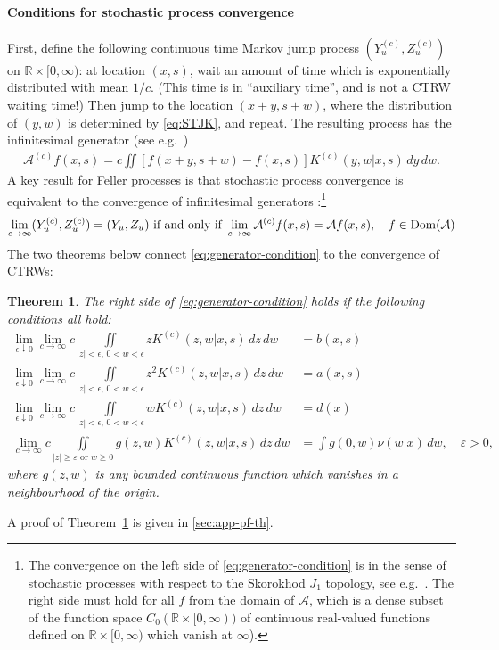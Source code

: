 \documentclass[a4paper,12pt]{elsarticle}
\numberwithin{equation}{section}
\theoremstyle{plain}
\newtheorem{theorem}{Theorem}[section]
\theoremstyle{definition}
\theoremstyle{remark}
\numberwithin{equation}{section}
\newcommand{\spc}{\mathbb R}
\newcommand{\spctim}{\spc \times [0,\infty)}
\newcommand{\1}{\mathbf 1}
\begin{document}
\paragraph{Conditions for stochastic process convergence}
First, define the following continuous time Markov jump process $(Y^{(c)}_u, Z^{(c)}_u)$ on 
$\spctim$: at location $(x,s)$, wait an amount of time which is exponentially distributed with mean $1/c$. (This time is in ``auxiliary time'', and is not a CTRW waiting time!) Then jump to the location $(x+y, s+w)$, where the distribution of $(y,w)$ is determined by \eqref{eq:STJK}, and repeat. The resulting process has the infinitesimal generator
(see e.g.\ \cite[Proposition 17.2]{Kallenberg}) 
\begin{align} \label{eq:jump-process-generator}
\mathcal A^{(c)} f(x,s) = c \iint [f(x+y, s+w) - f(x,s)] K^{(c)}(y,w | x,s)\,dy\,dw.
\end{align}
A key result for Feller processes is that stochastic process convergence is equivalent to the convergence of infinitesimal generators \cite[Theorem 17.25]{Kallenberg}:\footnote{The convergence on the left side of \eqref{eq:generator-condition} is in the sense of stochastic processes with respect to the Skorokhod $J_1$ topology, see e.g.\ \cite{Whitt2010}. The right side must hold for all $f$ from the domain of $\mathcal A$, which is a dense subset of the function space $C_0(\spctim)$ of continuous real-valued functions defined on $\spctim$ which vanish at $\infty$).}
\begin{align} \label{eq:generator-condition}
\lim_{c \to \infty}(Y^{(c)}_u, Z^{(c)}_u) = (Y_u, Z_u)
\text{ if and only if }
\lim_{c \to \infty} \mathcal A^{(c)}f(x,s) = \mathcal A f(x,s), 
\quad f \in {\rm Dom}(\mathcal A)
\end{align}
The two theorems below connect \eqref{eq:generator-condition} to the convergence of CTRWs: 

\begin{theorem} \label{theorem1}
The right side of \eqref{eq:generator-condition} holds if the following 
conditions all hold: 
\begin{align} \label{eq:cond1}
\lim_{\epsilon \downarrow 0} \lim_{c \to \infty}
c \iint\limits_{|z|< \epsilon,\,0<  w < \epsilon} z K^{(c)}(z,w | x,s)\,dz\,dw &= b(x,s)
\\ \label{eq:cond2}
\lim_{\epsilon \downarrow 0} \lim_{c \to \infty}
c \iint\limits_{|z|< \epsilon, \,0<w < \epsilon} z^2 K^{(c)}(z,w | x,s)\,dz\,dw &= a(x,s)
\\ \label{eq:cond3}
\lim_{\epsilon \downarrow 0} \lim_{c \to \infty}
c \iint\limits_{|z|< \epsilon, \,0<w < \epsilon} w K^{(c)}(z,w | x,s)\,dz\,dw &= d(x)
\\
\label{eq:cond4}
\lim_{c \to \infty}
c \iint\limits_{|z| \ge \varepsilon \text{ or } w \ge 0} g(z,w) K^{(c)} (z,w | x,s)\,dz\,dw &= \int g(0,w) \nu(w|x)\,dw, \quad \varepsilon > 0,
\end{align}
where $g(z,w)$ is any bounded continuous function which vanishes in a neighbourhood of the origin. 
\end{theorem}
A proof of Theorem~\ref{theorem1} is given in \ref{sec:app-pf-th}. 
\end{document}
